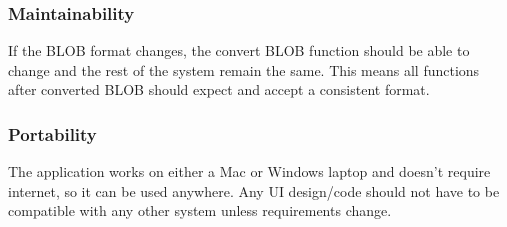 \documentclass[10pt,letterpaper,onecolumn]{article}
\begin{document}
\subsubsection{Maintainability}
If the BLOB format changes, the convert BLOB function should be able to change and the rest of the system remain the same.
This means all functions after converted BLOB should expect and accept a consistent format.

\subsubsection{Portability}
The application works on either a Mac or Windows laptop and doesn't require internet, so it can be used anywhere. Any UI design/code should not have to be compatible with any other system unless requirements change.
\end{document}
